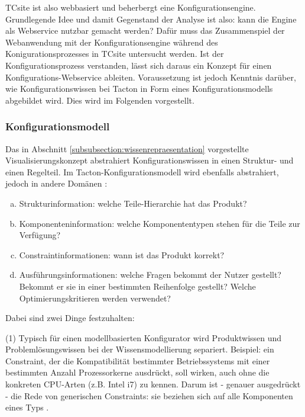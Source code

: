 \documentclass[12pt,a4paper,bibliography=totocnumbered,listof=totoc]{scrartcl}
\begin{document}
TCsite ist also webbasiert und beherbergt eine Konfigurationsengine. Grundlegende Idee und damit Gegenstand der Analyse ist also: kann die Engine als Webservice nutzbar gemacht werden? Dafür muss das Zusammenspiel der Webanwendung mit der Konfigurationsengine während des Konigurationsprozesses in TCsite untersucht werden. Ist der Konfigurationsprozess verstanden, lässt sich daraus ein Konzept für einen Konfigurations-Webservice ableiten. Voraussetzung ist jedoch Kenntnis darüber, wie Konfigurationswissen bei Tacton in Form eines Konfigurationsmodells abgebildet wird. Dies wird im Folgenden vorgestellt.

\subsubsection{Konfigurationsmodell}
Das in Abschnitt \ref{subsubsection:wissenrepraesentation} vorgestellte Visualisierungskonzept abstrahiert Konfigurationswissen in einen Struktur- und einen Regelteil. Im Tacton-Konfigurationsmodell wird ebenfalls abstrahiert, jedoch in andere Domänen \citep{tactonModeling}:

\begin{enumerate}[a.]
\item \label{strukturinformation} Strukturinformation: welche Teile-Hierarchie hat das Produkt? 
\item \label{komponenteninformation} Komponenteninformation: welche  Komponententypen stehen für die Teile zur Verfügung?
\item \label{constraintinformationen} Constraintinformationen: wann ist das Produkt korrekt?
\item \label{ausfuehrungsinformationen} Ausführungsinformationen: welche Fragen bekommt der Nutzer gestellt? Bekommt er sie in einer bestimmten Reihenfolge gestellt? Welche Optimierungskritieren werden verwendet?
\end{enumerate}

Dabei sind zwei Dinge festzuhalten:

(1) Typisch für einen modellbasierten Konfigurator wird Produktwissen und Problemlösungswissen bei der Wissensmodellierung separiert. Beispiel: ein Constraint, der die Kompatibilität bestimmter Betriebssystems mit einer bestimmten Anzahl Prozessorkerne ausdrückt, soll wirken, auch ohne die konkreten CPU-Arten (z.B. Intel i7) zu kennen. Darum ist - genauer ausgedrückt - die Rede von generischen Constraints: sie beziehen sich auf alle Komponenten eines Typs \citep{felferning14}.
\end{document}
